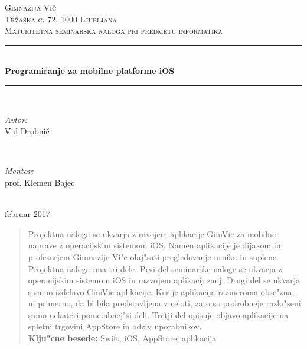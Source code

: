 \documentclass[a4paper, 12pt]{article}
\begin{document}
	\begin{titlepage}
		\newcommand{\HRule}{\rule{\linewidth}{0.5mm}}
		\center

		\textsc{\LARGE Gimnazija Vič}\\[0.5cm]
		\textsc{\Large Tržaška c. 72, 1000 Ljubljana}\\[0.5cm]
		\textsc{\Large Maturitetna seminarska naloga pri predmetu informatika}\\[1cm]

		\HRule \\[0.4cm]
		{ \huge \bfseries Programiranje za mobilne platforme iOS}\\[0.4cm]
		\HRule \\[1.5cm]

		\begin{minipage}{0.4\textwidth}
			\begin{flushleft} \large
				\emph{Avtor:}\\
				Vid Drobnič
			\end{flushleft}
		\end{minipage}
		~
		\begin{minipage}{0.4\textwidth}
			\begin{flushright} \large
				\emph{Mentor:} \\
				prof. Klemen Bajec
			\end{flushright}
		\end{minipage}\\[4cm]

		{\large februar 2017}\\[3cm]
		\vfill
	\end{titlepage}

	\begin{abstract}
		\noindent Projektna naloga se ukvarja z ravojem aplikacije GimVic za mobilne naprave z operacijskim sistemom iOS. Namen aplikacije je dijakom in profesorjem Gimnazije Vi"c olaj"sati pregledovanje urnika in suplenc. Projektna naloga ima tri dele. Prvi del seminarske naloge se ukvarja z operacijskim sistemom iOS in razvojem aplikacij zanj. Drugi del se ukvarja s samo izdelavo GimVic aplikacije. Ker je aplikacija razmeroma obse"zna, ni primerno, da bi bila predstavljena v celoti, zato so podrobneje razlo"zeni samo nekateri pomembnej"si deli. Tretji del opisuje objavo aplikacije na spletni trgovini AppStore in odziv uporabnikov.\\
		
		\noindent \textbf{Klju"cne besede:} Swift, iOS, AppStore, aplikacija
	\end{abstract}
\end{document}
